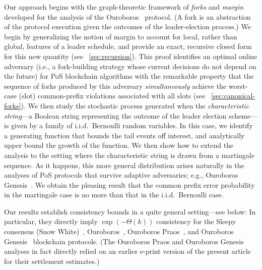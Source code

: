  Our approach begins with the
graph-theoretic framework of \emph{forks} and \emph{margin} developed
for the analysis of the Ouroboros~\cite{KRDO17} protocol.  (A fork is
an abstraction of the protocol execution given the outcomes of the
leader-election process.)  We begin by generalizing the notion of
margin to account for local, rather than global, features of a leader
schedule, and provide an exact, recursive closed form for this new
quantity (see \Section~\ref{sec:recursion}). This proof identifies an
optimal online adversary (i.e., a fork-building strategy whose current
decisions do not depend on the future) for PoS blockchain algorithms
with the remarkable property that the sequence of forks produced by
this adversary \emph{simultaneously} achieve the worst-case (slot)
common-prefix violations associated with all slots (see
\Section~\ref{sec:canonical-forks}). We then study the stochastic
process generated when the \emph{characteristic string}---a Boolean
string representing the outcome of the leader election scheme---is
given by a family of i.i.d.\ Bernoulli random variables. In this case,
we identify a generating function that bounds the tail events off
interest, and analytically upper bound the growth of the function. We
then show how to extend the analysis to the setting where the
characteristic string is drawn from a martingale sequence.  As it
happens, this more general distribution arises naturally in the
analyses of PoS protocols that survive adaptive adversaries; e.g.,
Ouroboros Genesis~\cite{DBLP:journals/iacr/BadertscherGKRZ18}.  We
obtain the pleasing result that the common prefix error probability in
the martingale case is no more than that in the i.i.d.\ Bernoulli
case.

Our results establish consistency bounds in a quite general
setting---see below: In particular, they directly imply
$\exp(-\Theta(k))$ consistency for the Sleepy consensus (Snow
White)~\cite{DBLP:conf/asiacrypt/PassS17}, Ouroboros~\cite{KRDO17},
Ouroboros Praos~\cite{DBLP:conf/eurocrypt/DavidGKR18}, and Ouroboros
Genesis~\cite{DBLP:journals/iacr/BadertscherGKRZ18} blockchain
protocols. (The Ouroboros Praos and Ouroboros Genesis analyses in fact
directly relied on an earlier e-print version of the present article
for their settlement estimates.)

